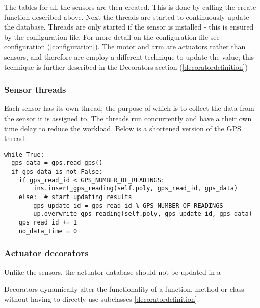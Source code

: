 The tables for all the sensors are then created. This is done by calling the create function described above. Next the threads are started to continuously update the database. Threads are only started if the sensor is installed - this is ensured by the configuration file. For more detail on the configuration file see configuration  (\ref{configuration}). The motor and arm are actuators rather than sensors, and therefore are employ a different technique to update the value; this technique is further described in the Decorators section (\ref{decoratordefinition})

\subsubsection{Sensor threads}
Each sensor has its own thread; the purpose of which is to collect the data from the sensor it is assigned to. The threads run concurrently and have a their own time delay to reduce the workload.
Below is a shortened version of the GPS thread.
\begin{lstlisting}
while True:
  gps_data = gps.read_gps()
  if gps_data is not False:
    if gps_read_id < GPS_NUMBER_OF_READINGS:
   		ins.insert_gps_reading(self.poly, gps_read_id, gps_data)
    else:  # start updating results
   		gps_update_id = gps_read_id % GPS_NUMBER_OF_READINGS
    	up.overwrite_gps_reading(self.poly, gps_update_id, gps_data)
    gps_read_id += 1
    no_data_time = 0
\end{lstlisting}

\subsubsection{Actuator decorators}
Unlike the sensors, the actuator database should not be updated in a

\label{decoratordefinition}
Decorators dynamically alter the functionality of a function, method or class without having to directly use subclasses \ref{decoratordefinition}.
